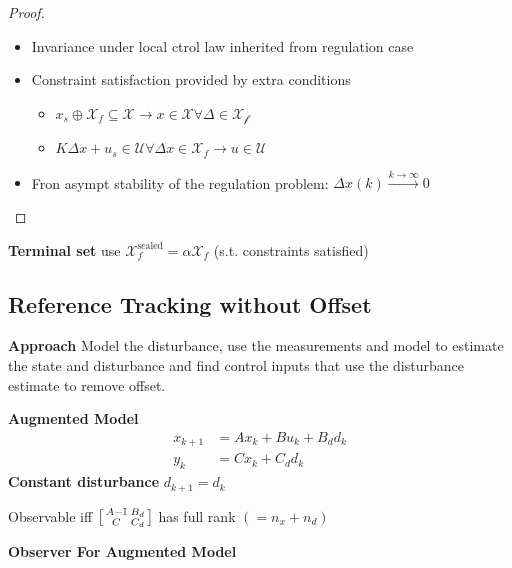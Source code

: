 \begin{proof}

	\begin{itemize}[leftmargin = 1em]
		\item Invariance under local ctrol law inherited from regulation case
		\item Constraint satisfaction provided by extra conditions
		      \begin{itemize}
			      \item $x_s \oplus \mathcal{X}_f \subseteq \mathcal{X} \to x\in \mathcal{X} \forall \Delta \in\mathcal{X_f}$
			      \item $K\Delta x + u_s \in \mathcal{U} \forall \Delta x \in \mathcal{X}_f \to u\in\mathcal{U}$
		      \end{itemize}
		\item Fron asympt stability of the regulation problem: $\Delta x (k) \xrightarrow{k\to\infty}0$
	\end{itemize}
\end{proof}

\textbf{Terminal set} use
$\mathcal{X}_f^{\text{scaled}} = \alpha \mathcal{X}_f$
(s.t. constraints satisfied)

\subsection{Reference Tracking without Offset}

\textbf{Approach}
Model the disturbance,
use the measurements and model
to estimate the state and disturbance
and find control inputs that use
the disturbance estimate to remove offset.

\textbf{Augmented Model}
\begin{align*}
	x_{k+1} & = Ax_k + Bu_k + B_d d_k \\
	y_k     & = Cx_k + C_d d_k
\end{align*}
\textbf{Constant disturbance}
$d_{k+1}  = d_k$

Observable iff
$\begin{bsmallmatrix}
		A - \mathbb{I} & B_d \\ C & C_d
	\end{bsmallmatrix}$
has full rank $(=n_x + n_d)$

\textbf{Observer For Augmented Model}

